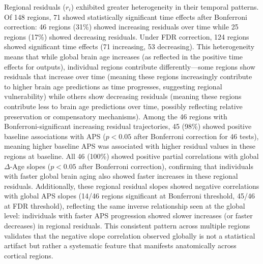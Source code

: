 \documentclass[conference]{IEEEtran}
\begin{document}
Regional residuals ($r_i$) exhibited greater heterogeneity in their temporal patterns. Of 148 regions, 71 showed statistically significant time effects after Bonferroni correction: 46 regions (31\%) showed increasing residuals over time while 25 regions (17\%) showed decreasing residuals. Under FDR correction, 124 regions showed significant time effects (71 increasing, 53 decreasing). This heterogeneity means that while global brain age increases (as reflected in the positive time effects for outputs), individual regions contribute differently---some regions show residuals that increase over time (meaning these regions increasingly contribute to higher brain age predictions as time progresses, suggesting regional vulnerability) while others show decreasing residuals (meaning these regions contribute less to brain age predictions over time, possibly reflecting relative preservation or compensatory mechanisms). Among the 46 regions with Bonferroni-significant increasing residual trajectories, 45 (98\%) showed positive baseline associations with APS ($p < 0.05$ after Bonferroni correction for 46 tests), meaning higher baseline APS was associated with higher residual values in these regions at baseline. All 46 (100\%) showed positive partial correlations with global $\Delta$-Age slopes ($p < 0.05$ after Bonferroni correction), confirming that individuals with faster global brain aging also showed faster increases in these regional residuals. Additionally, these regional residual slopes showed negative correlations with global APS slopes (14/46 regions significant at Bonferroni threshold, 45/46 at FDR threshold), reflecting the same inverse relationship seen at the global level: individuals with faster APS progression showed slower increases (or faster decreases) in regional residuals. This consistent pattern across multiple regions validates that the negative slope correlation observed globally is not a statistical artifact but rather a systematic feature that manifests anatomically across cortical regions.
\end{document}
